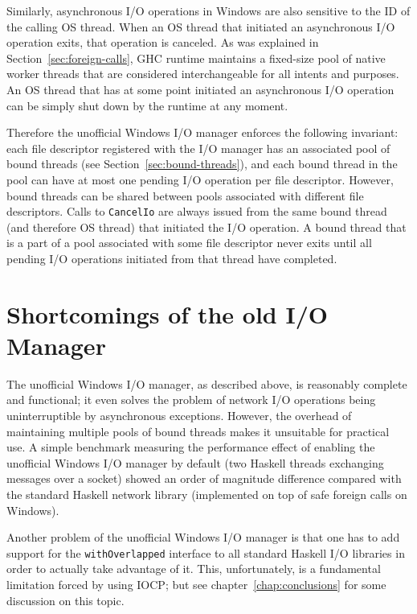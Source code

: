 \documentclass[a4paper,11pt,oneside]{report}
\begin{document}
Similarly, asynchronous I/O operations in Windows are also sensitive to the ID
of the calling OS thread. When an OS thread that initiated an asynchronous I/O
operation exits, that operation is canceled. As was explained in
Section~\ref{sec:foreign-calls}, GHC runtime maintains a fixed-size pool of
native worker threads that are considered interchangeable for all intents and
purposes. An OS thread that has at some point initiated an asynchronous I/O
operation can be simply shut down by the runtime at any moment.

Therefore the unofficial Windows I/O manager enforces the following invariant:
each file descriptor registered with the I/O manager has an associated pool of
bound threads (see Section~\ref{sec:bound-threads}), and each bound thread in
the pool can have at most one pending I/O operation per file
descriptor. However, bound threads can be shared between pools associated with
different file descriptors. Calls to \texttt{CancelIo} are always issued from
the same bound thread (and therefore OS thread) that initiated the I/O
operation. A bound thread that is a part of a pool associated with some file
descriptor never exits until all pending I/O operations initiated from that
thread have completed.

\section{Shortcomings of the old I/O Manager}
\label{sec:shortcomings-old-io-manager}

The unofficial Windows I/O manager, as described above, is reasonably complete
and functional; it even solves the problem of network I/O operations being
uninterruptible by asynchronous exceptions. However, the overhead of maintaining
multiple pools of bound threads makes it unsuitable for practical use. A simple
benchmark measuring the performance effect of enabling the unofficial Windows
I/O manager by default (two Haskell threads exchanging messages over a socket)
showed an order of magnitude difference compared with the standard Haskell
network library (implemented on top of safe foreign calls on Windows).

Another problem of the unofficial Windows I/O manager is that one has to add
support for the \texttt{withOverlapped} interface to all standard Haskell I/O
libraries in order to actually take advantage of it. This, unfortunately, is a
fundamental limitation forced by using IOCP; but see
chapter~\ref{chap:conclusions} for some discussion on this topic.
\end{document}
